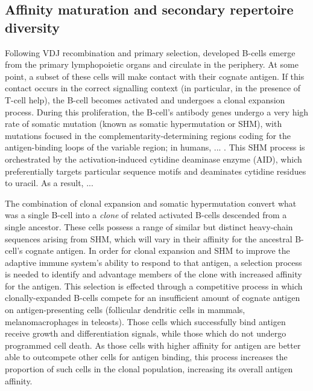
\subsection{Affinity maturation and secondary repertoire diversity}

Following VDJ recombination and primary selection, developed \naive B-cells emerge from the primary lymphopoietic organs and circulate in the periphery. At some point, a subset of these \naive cells will make contact with their cognate antigen. If this contact occurs in the correct signalling context (in particular, in the presence of T-cell help), %
the B-cell becomes activated and undergoes a clonal expansion process. During this proliferation, the B-cell's antibody genes undergo a very high rate of somatic mutation (known as somatic hypermutation or SHM), with mutations focused in the complementarity-determining regions coding for the antigen-binding loops of the variable region; in humans, ... %
. This SHM process is orchestrated by the activation-induced cytidine deaminase enzyme (AID), which preferentially targets particular sequence motifs and deaminates cytidine residues to uracil. As a result, ... %

The combination of clonal expansion and somatic hypermutation convert what was a single \naive B-cell into a \textit{clone} of related activated B-cells descended from a single \naive ancestor. These cells possess a range of similar but distinct heavy-chain sequences arising from SHM, which will vary in their affinity for the ancestral B-cell's cognate antigen. In order for clonal expansion and SHM to improve the adaptive immune system's ability to respond to that antigen, a selection process is needed to identify and advantage members of the clone with increased affinity for the antigen. This selection is effected through a competitive process in which clonally-expanded B-cells compete for an insufficient amount of cognate antigen on antigen-presenting cells (follicular dendritic cells in mammals, melanomacrophages in teleosts). Those cells which successfully bind antigen receive growth and differentiation signals, while those which do not undergo programmed cell death. As those cells with higher affinity for antigen are better able to outcompete other cells for antigen binding, this process increases the proportion of such cells in the clonal population, increasing its overall antigen affinity.


